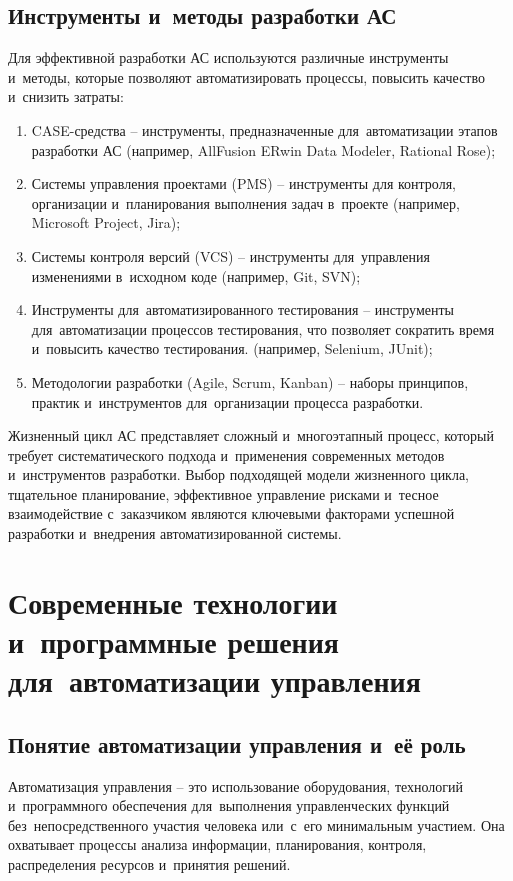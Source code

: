 \documentclass{ou}
\begin{document}
\subsection{Инструменты и~методы разработки АС}
Для эффективной разработки АС используются различные инструменты и~методы, которые позволяют автоматизировать процессы, повысить качество и~снизить затраты:
\begin{enumerate}[leftmargin=0em, itemindent=3.75em, nosep, label=\arabic*)]
\item CASE-средства -- инструменты, предназначенные для~автоматизации этапов разработки АС (например, AllFusion ERwin Data Modeler, Rational Rose);
\item Системы управления проектами (PMS) -- инструменты для контроля, организации и~планирования выполнения задач в~проекте (например, Microsoft Project, Jira);
\item Системы контроля версий (VCS) -- инструменты для~управления изменениями в~исходном коде (например, Git, SVN);
\item Инструменты для~автоматизированного тестирования -- инструменты для~автоматизации процессов тестирования, что позволяет сократить время и~повысить качество тестирования. (например, Selenium, JUnit);
\item Методологии разработки (Agile, Scrum, Kanban) -- наборы принципов, практик и~инструментов для~организации процесса разработки.
\end{enumerate}

Жизненный цикл АС представляет сложный и~многоэтапный процесс, который требует систематического подхода и~применения современных методов и~инструментов разработки. Выбор подходящей модели жизненного цикла, тщательное планирование, эффективное управление рисками и~тесное взаимодействие с~заказчиком являются ключевыми факторами успешной разработки и~внедрения автоматизированной системы.
\newpage
\section{Современные технологии и~программные решения для~автоматизации управления}
\subsection{Понятие автоматизации управления и~её роль}
Автоматизация управления -- это использование оборудования, технологий и~программного обеспечения для~выполнения управленческих функций без~непосредственного участия человека или~с~его минимальным участием. Она охватывает процессы анализа информации, планирования, контроля, распределения ресурсов и~принятия решений.
\end{document}
